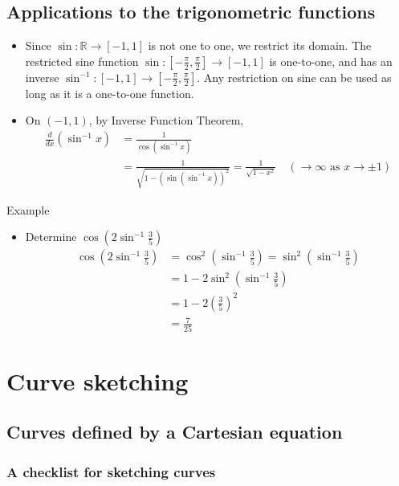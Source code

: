 \documentclass{report}
\begin{document}
	\section{Applications to the trigonometric functions}

		\begin{itemize}
			\item Since $\sin: \mathbb{R} \to [-1,1]$ is not one to one, we restrict its domain. The restricted sine function $\sin: [-\frac{\pi}{2}, \frac{\pi}{2}] \to [-1,1]$ is one-to-one, and has an inverse $\sin^{-1}: [-1,1] \to [-\frac{\pi}{2}, \frac{\pi}{2}]$. Any restriction on sine can be used as long as it is a one-to-one function.
			\item On $(-1,1)$, by Inverse Function Theorem,
				\begin{align*}
					\frac{d}{dx}\left(\sin^{-1}x\right) &= \frac{1}{\cos(\sin^{-1}x)}	\\
														&= \frac{1}{\sqrt{1 - (\sin(\sin^{-1}x))^2}} = \frac{1}{\sqrt{1 - x^2}} \quad (\to \infty \text{ as } x \to \pm 1)
				\end{align*}
		\end{itemize}

		\begin{question}{Example}
			\begin{itemize}
				\item Determine $\cos(2\sin^{-1}\frac{3}{5})$
					\begin{alignat*}
						\cos(2\sin^{-1}\frac{3}{5}) &= \cos^2(\sin^{-1} \frac{3}{5}) = \sin^2(\sin^{-1} \frac{3}{5})	\\
													&= 1 - 2 \sin^2(\sin^{-1}\frac{3}{5})	\\
													&= 1 - 2(\frac{3}{5})^2		\\
													&= \frac{7}{25}
					\end{alignat*}
			\end{itemize}
		\end{question}

\chapter{Curve sketching}
	
	\section{Curves defined by a Cartesian equation}

		\subsection{A checklist for sketching curves}
			
\end{document}
